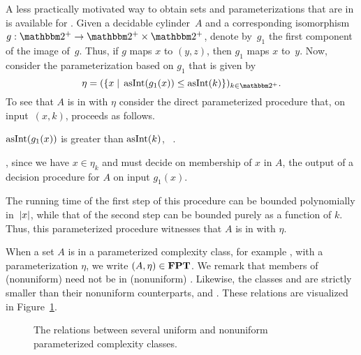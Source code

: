 \begin{example}
\label{ex:p-cylinder}%
  A less practically motivated way to obtain sets and parameterizations that are in  is available for .
  Given a decidable \pdash{}cylinder~$A$ and a corresponding isomorphism~$g : \binary^+ \to \binary^+ \times \binary^+$, denote by~$g_1$ the first component of the image of~$g$.
  Thus, if $g$ maps $x$ to $(y, z)$, then $g_1$ maps $x$ to~$y$.
  Now, consider the parameterization based on $g_1$ that is given by
  \begin{equation*}
    \eta \deq (\{x \st \asNat(g_1(x)) \le \asNat(k)\})_{k \in \binary^+}.
  \end{equation*}
  To see that $A$ is in  with $\eta$ consider the direct parameterized procedure that, on input~$(x, k)$, proceeds as follows.
  \begin{codelisting}
  \item
     $\asNat(g_1(x))$ is greater than $\asNat(k)$, ~.
  \item
    , since we have $x \in \eta_k$ and must decide on membership of $x$ in $A$,
    \itemcont {} the output of a decision procedure for $A$ on input $g_1(x)$.
  \end{codelisting}
  The running time of the first step of this procedure can be bounded polynomially in~${\lvert x\rvert}$, while that of the second step can be bounded purely as a function of $k$.
  Thus, this parameterized procedure witnesses that $A$ is in  with $\eta$.
\end{example}

When a set $A$ is in a parameterized complexity class, for example , with a parameterization $\eta$, we write $(A, \eta) \in \textnormal{\textbf{FPT}}$.
We remark that members of (nonuniform)  need not be in (nonuniform)  \parencite{downey1999parameterized,flum2006parameterized}.
Likewise, the classes  and  are strictly smaller than their nonuniform counterparts,  and  \parencite{downey1993fixed}.
These relations are visualized in Figure~\ref{fig:parameterized_classes}.
\begin{figure}
  \centering
  \caption{
    The relations between several uniform and nonuniform parameterized complexity classes.
  }
  \label{fig:parameterized_classes}
\end{figure}


